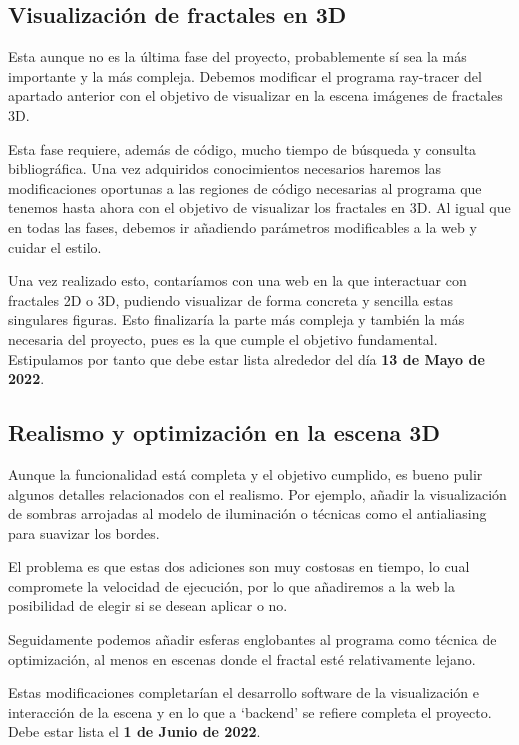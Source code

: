 \subsection*{Visualización de fractales en 3D}

Esta aunque no es la última fase del proyecto, probablemente sí sea la más importante y la más compleja. Debemos modificar el programa ray-tracer del apartado anterior con el objetivo de visualizar en la escena imágenes de fractales 3D.

Esta fase requiere, además de código, mucho tiempo de búsqueda y consulta bibliográfica. Una vez adquiridos conocimientos necesarios haremos las modificaciones oportunas a las regiones de código necesarias al programa que tenemos hasta ahora con el objetivo de visualizar los fractales en 3D.
Al igual que en todas las fases, debemos ir añadiendo parámetros modificables a la web y cuidar el estilo.

Una vez realizado esto, contaríamos con una web en la que interactuar con fractales 2D o 3D, pudiendo visualizar de forma concreta y sencilla estas singulares figuras. Esto finalizaría la parte más compleja y también la más necesaria del proyecto, pues es la que cumple el objetivo fundamental. Estipulamos por tanto que debe estar lista alrededor del día \textbf{13 de Mayo de 2022}.

\subsection*{Realismo y optimización en la escena 3D}

Aunque la funcionalidad está completa y el objetivo cumplido, es bueno pulir algunos detalles relacionados con el realismo. Por ejemplo, añadir la visualización de sombras arrojadas al modelo de iluminación o técnicas como el antialiasing para suavizar los bordes.

El problema es que estas dos adiciones son muy costosas en tiempo, lo cual compromete la velocidad de ejecución, por lo que añadiremos a la web la posibilidad de elegir si se desean aplicar o no.

Seguidamente podemos añadir esferas englobantes al programa como técnica de optimización, al menos en escenas donde el fractal esté relativamente lejano.

Estas modificaciones completarían el desarrollo software de la visualización e interacción de la escena y en lo que a `backend' se refiere completa el proyecto. Debe estar lista el \textbf{1 de Junio de 2022}.

